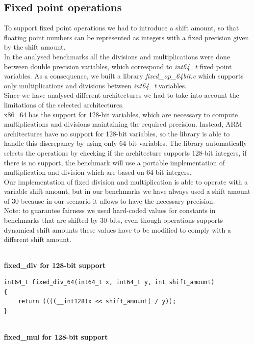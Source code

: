 \subsection{Fixed point operations}

To support fixed point operations we had to introduce a shift amount, so that floating point numbers can be represented as integers with a fixed precision given by the shift amount.\\ In the analysed benchmarks all the divisions and multiplications were done between double precision variables, which correspond to \textit{int64\_t} fixed point variables. As a consequence, we built a library \textit{fixed\_op\_64bit.c} which supports only multiplications and divisions between \textit{int64\_t} variables.\\
Since we have analysed different architectures we had to take into account the limitations of the selected architectures.\\ x86\_64 has the support for 128-bit variables, which are necessary to compute multiplications and divisions maintaining the required precision. Instead, ARM architectures have no support for 128-bit variables, so the library is able to handle this discrepancy by using only 64-bit variables.
The library automatically selects the operations by checking if the architecture supports 128-bit integers, if there is no support, the benchmark will use a portable implementation of multiplication and division which are based on 64-bit integers.\\ Our implementation of fixed division and multiplication is able to operate with a variable shift amount, but in our benchmarks we have always used a shift amount of 30 because in our scenario it allows to have the necessary precision.\\ Note: to guarantee fairness we used hard-coded values for constants in benchmarks that are shifted by 30-bits, even though operations supports dynamical shift amounts these values have to be modified to comply with a different shift amount.

\textbf{\\fixed\_div for 128-bit support}

\begin{lstlisting}
int64_t fixed_div_64(int64_t x, int64_t y, int shift_amount)
{
    return ((((__int128)x << shift_amount) / y));
}
\end{lstlisting}

\textbf{\\fixed\_mul for 128-bit support}


